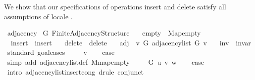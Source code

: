 \begin{isabellebody}
%
\endisatagproof
{\isafoldproof}%
%
\isadelimproof
%
\endisadelimproof
%
\begin{isamarkuptext}%
We show that our specifications of operations insert and delete satisfy all assumptions of locale
.%
\end{isamarkuptext}\isamarkuptrue%
\isamarkupfalse%
\ adjacency\isanewline
{}\isanewline
{}\isamarkupfalse%
\ G{\isacharcolon}{\kern0pt}\ Finite{\isacharunderscore}{\kern0pt}Adjacency{\isacharunderscore}{\kern0pt}Structure\ \isanewline
\ \ empty\ {\isacharequal}{\kern0pt}\ Map{\isacharunderscore}{\kern0pt}empty\ \isanewline
\ \ insert\ {\isacharequal}{\kern0pt}\ insert{\isacharprime}{\kern0pt}\ \isanewline
\ \ delete\ {\isacharequal}{\kern0pt}\ delete{\isacharprime}{\kern0pt}\ \isanewline
\ \ adj\ {\isacharequal}{\kern0pt}\ {\isachardoublequoteopen}{\isacharparenleft}{\kern0pt}{\isasymlambda}v\ G{\isachardot}{\kern0pt}\ adjacency{\isacharunderscore}{\kern0pt}list\ G\ v{\isacharparenright}{\kern0pt}{\isachardoublequoteclose}\ \isanewline
\ \ inv\ {\isacharequal}{\kern0pt}\ invar\isanewline
%
\isadelimproof
%
\endisadelimproof
%
\isatagproof
{}\isamarkupfalse%
\ {\isacharparenleft}{\kern0pt}standard{\isacharcomma}{\kern0pt}\ goal{\isacharunderscore}{\kern0pt}cases{\isacharparenright}{\kern0pt}\isanewline
\ \ \isamarkupfalse%
\ {\isacharparenleft}{\kern0pt}{}\ v{\isacharparenright}{\kern0pt}\isanewline
\ \ \isamarkupfalse%
\ {\isacharquery}{\kern0pt}case\isanewline
\ \ \ \ \isamarkupfalse%
\ {\isacharparenleft}{\kern0pt}simp\ add{\isacharcolon}{\kern0pt}\ adjacency{\isacharunderscore}{\kern0pt}list{\isacharunderscore}{\kern0pt}def\ M{\isachardot}{\kern0pt}map{\isacharunderscore}{\kern0pt}empty{\isacharparenright}{\kern0pt}\isanewline
{}\isamarkupfalse%
\isanewline
\ \ \isamarkupfalse%
\ {\isacharparenleft}{\kern0pt}{}\ G\ u\ v\ w{\isacharparenright}{\kern0pt}\isanewline
\ \ \isamarkupfalse%
\ {\isacharquery}{\kern0pt}case\isanewline
\ \ \ \ \isamarkupfalse%
\ {\isacharparenleft}{\kern0pt}intro\ adjacency{\isacharunderscore}{\kern0pt}list{\isacharunderscore}{\kern0pt}insert{\isacharprime}{\kern0pt}{\isacharunderscore}{\kern0pt}cong{\isacharparenright}{\kern0pt}\ {\isacharparenleft}{\kern0pt}drule\ conjunct{}{\isacharparenright}{\kern0pt}\isanewline

\end{isabellebody}
